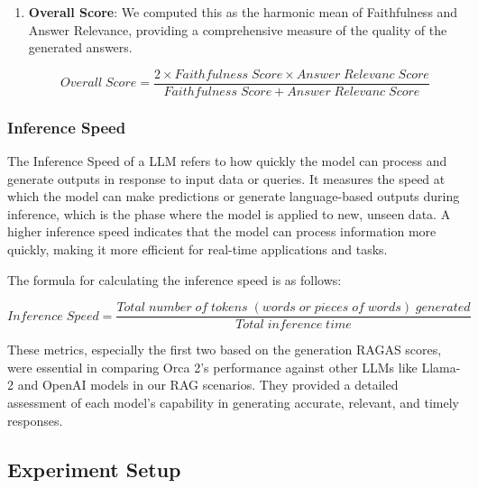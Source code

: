 \documentclass[runningheads]{llncs}
\begin{document}
\begin{enumerate}
    \item \textbf{Overall Score}: We computed this as the harmonic mean of Faithfulness and Answer Relevance, providing a comprehensive measure of the quality of the generated answers.

\[
    Overall\;Score = \frac{2 \times Faithfulness\;Score \times  Answer\;Relevanc\;Score}{Faithfulness\;Score + Answer\;Relevanc\;Score}
\]
    
\end{enumerate}
\subsubsection{Inference Speed}
 The Inference Speed of a LLM refers to how quickly the model can process and generate outputs in response to input data or queries. It measures the speed at which the model can make predictions or generate language-based outputs during inference, which is the phase where the model is applied to new, unseen data. A higher inference speed indicates that the model can process information more quickly, making it more efficient for real-time applications and tasks.


 The formula for calculating the inference speed is as follows:

\[
    Inference\;Speed = \frac{Total\;number\;of\;tokens\;(words\;or\;pieces\;of\;words)\;generated}{Total\;inference\;time}
\]
  
These metrics, especially the first two based on the generation RAGAS\cite{es2023ragas} scores, were essential in comparing Orca 2's performance against other LLMs like Llama-2 and OpenAI models in our RAG scenarios. They provided a detailed assessment of each model's capability in generating accurate, relevant, and timely responses.

\subsection{Experiment Setup}
\end{document}
